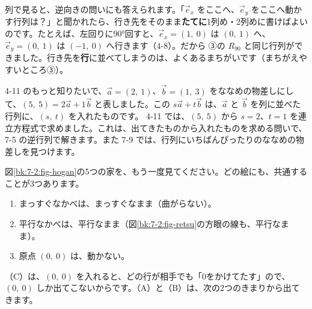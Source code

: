 列で見ると、逆向きの問いにも答えられます。「$\vec e_x$ をここへ、$\vec e_y$ をここへ動かす行列は？」と聞かれたら、行き先をそのまま\textbf{たてに}1列め・2列めに書けばよいのです。たとえば、左回りに90°回すと、$\vec e_x=(1,\ 0)$ は $(0,\ 1)$ へ、$\vec e_y=(0,\ 1)$ は $(-1,\ 0)$ へ行きます（4-8）。だから
③の $R_{90}$ と同じ行列ができました。行き先を\textbf{行}に並べてしまうのは、よくあるまちがいです（まちがえやすいところ③）。

4-11 のもっと知りたいで、$\vec a=(2,\ 1)$、$\vec b=(1,\ 3)$ をななめの物差しにして、$(5,\ 5)=2\vec a+1\vec b$ と表しました。この $s\vec a+t\vec b$ は、$\vec a$ と $\vec b$ を列に並べた行列に、$(s,\ t)$ を入れたものです。
4-11 では、$(5,\ 5)$ から $s=2$、$t=1$ を連立方程式で求めました。これは、出てきたものから入れたものを求める問いで、7-5 の逆行列で解きます。また 7-9 では、行列にいちばんぴったりのななめの物差しを見つけます。

\label{bk:7-2:senkei}

図\ref{bk:7-2:fig-hogan}の5つの家を、もう一度見てください。どの絵にも、共通することが3つあります。
\begin{enumerate}[label={（\textsf{\textbf{\Alph*}}）}, leftmargin=3\zw, itemsep=2pt, topsep=2pt]
\item まっすぐなかべは、まっすぐなまま（曲がらない）。
\item 平行なかべは、平行なまま（図\ref{bk:7-2:fig-retsu}の方眼の線も、平行なまま）。
\item 原点 $(0,\ 0)$ は、動かない。
\end{enumerate}
（C）は、$(0,\ 0)$ を入れると、どの行が相手でも「0をかけてたす」ので、$(0,\ 0)$ しか出てこないからです。（A）と（B）は、次の2つのきまりから出てきます。

